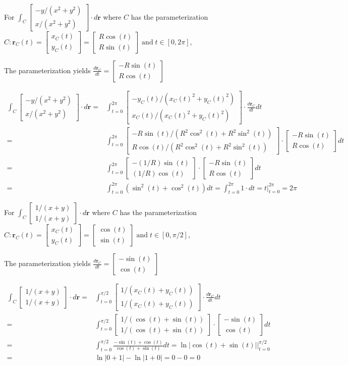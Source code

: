 \documentclass{article}
\newcommand{\abs}[1]{\left|#1\right|}
\newcommand{\colxyvec}[2]{\begin{bmatrix} #1 \\ #2 \end{bmatrix}}
\newcommand{\at}[1]{\left. #1 \right|}
\newcommand{\dr}[1]{\textcolor{dark_red}{#1}}
\begin{document}
\begin{framed} 
\dr{For \(\int_C \colxyvec{-y/(x^2 + y^2)}{x/(x^2 + y^2)} \cdot d\mathbf{r}\) where \(C\) has the parameterization \(C: \mathbf{r}_C(t) = \colxyvec{x_C(t)}{y_C(t)} = \colxyvec{R\cos(t)}{R\sin(t)} \;\text{and}\; t \in [0, 2\pi]\),}

\dr{The parameterization yields \(\frac{d\mathbf{r}_C}{dt} = \colxyvec{-R\sin(t)}{R\cos(t)}\)}

\dr{\begin{align*}
\int_C \colxyvec{-y/(x^2 + y^2)}{x/(x^2 + y^2)} \cdot d\mathbf{r} = & \int_{t = 0}^{2\pi} \colxyvec{-y_C(t)/(x_C(t)^2 + y_C(t)^2)}{x_C(t)/(x_C(t)^2 + y_C(t)^2)} \cdot \frac{d\mathbf{r}_C}{dt}dt \\
= & \int_{t = 0}^{2\pi} \colxyvec{-R\sin(t)/(R^2\cos^2(t) + R^2\sin^2(t))}{R\cos(t)/(R^2\cos^2(t) + R^2\sin^2(t))} \cdot \colxyvec{-R\sin(t)}{R\cos(t)}dt \\
= & \int_{t = 0}^{2\pi} \colxyvec{-(1/R)\sin(t)}{(1/R)\cos(t)} \cdot \colxyvec{-R\sin(t)}{R\cos(t)}dt \\
= & \int_{t = 0}^{2\pi} (\sin^2(t) + \cos^2(t))dt 
= \int_{t = 0}^{2\pi} 1 \cdot dt 
= \at{t}_{t=0}^{2\pi} 
= 2\pi
\end{align*}}
\end{framed}

\pagebreak

\begin{framed}
\dr{For \(\int_C \colxyvec{1/(x+y)}{1/(x+y)} \cdot d\mathbf{r}\) where \(C\) has the parameterization \(C: \mathbf{r}_C(t) = \colxyvec{x_C(t)}{y_C(t)} = \colxyvec{\cos(t)}{\sin(t)} \;\text{and}\; t \in [0,\pi/2]\),}

\dr{The parameterization yields \(\frac{d\mathbf{r}_C}{dt} = \colxyvec{-\sin(t)}{\cos(t)}\)}

\dr{\begin{align*}
\int_C \colxyvec{1/(x+y)}{1/(x+y)} \cdot d\mathbf{r} = & \int_{t = 0}^{\pi/2} \colxyvec{1/(x_C(t)+y_C(t))}{1/(x_C(t)+y_C(t))} \cdot \frac{d\mathbf{r}_C}{dt}dt \\
= & \int_{t = 0}^{\pi/2} \colxyvec{1/(\cos(t)+\sin(t))}{1/(\cos(t)+\sin(t))} \cdot \colxyvec{-\sin(t)}{\cos(t)}dt \\ 
= & \int_{t = 0}^{\pi/2} \frac{-\sin(t) + \cos(t)}{\cos(t) + \sin(t)}dt 
= \at{\ln\abs{\cos(t) + \sin(t)}}_{t = 0}^{\pi/2} \\
= & \ln\abs{0 + 1} - \ln\abs{1 + 0} = 0 - 0 = 0
\end{align*}}
\end{framed}
\end{document}

